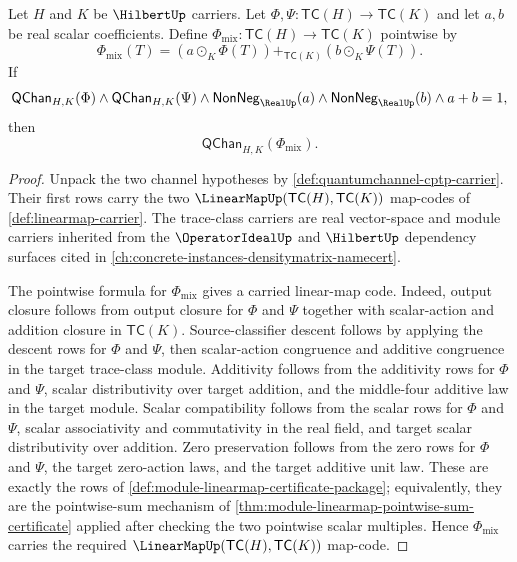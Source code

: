 \begin{lemma}
\label{lem:quantumchannel-binary-convex-mixture-closure}
Let $H$ and $K$ be $\HilbertUp$ carriers. Let $\Phi,\Psi:\mathsf{TC}(H)\to\mathsf{TC}(K)$ and let $a,b$ be real scalar coefficients. Define $\Phi_{\mathrm{mix}}:\mathsf{TC}(H)\to\mathsf{TC}(K)$ pointwise by
$$
\Phi_{\mathrm{mix}}(T)
=
(a\odot_K\Phi(T))+_{\mathsf{TC}(K)}(b\odot_K\Psi(T)).
$$
If
$$
\mathsf{QChan}_{H,K}(\Phi)
\land
\mathsf{QChan}_{H,K}(\Psi)
\land
\mathsf{NonNeg}_{\RealUp}(a)
\land
\mathsf{NonNeg}_{\RealUp}(b)
\land
 a+b=1,
$$
then
$$
\mathsf{QChan}_{H,K}(\Phi_{\mathrm{mix}}).
$$
\end{lemma}
\begin{proof}
Unpack the two channel hypotheses by \autoref{def:quantumchannel-cptp-carrier}. Their first rows carry the two $\LinearMapUp(\mathsf{TC}(H),\mathsf{TC}(K))$ map-codes of \autoref{def:linearmap-carrier}. The trace-class carriers are real vector-space and module carriers inherited from the $\OperatorIdealUp$ and $\HilbertUp$ dependency surfaces cited in \autoref{ch:concrete-instances-densitymatrix-namecert}.

The pointwise formula for $\Phi_{\mathrm{mix}}$ gives a carried linear-map code. Indeed, output closure follows from output closure for $\Phi$ and $\Psi$ together with scalar-action and addition closure in $\mathsf{TC}(K)$. Source-classifier descent follows by applying the descent rows for $\Phi$ and $\Psi$, then scalar-action congruence and additive congruence in the target trace-class module. Additivity follows from the additivity rows for $\Phi$ and $\Psi$, scalar distributivity over target addition, and the middle-four additive law in the target module. Scalar compatibility follows from the scalar rows for $\Phi$ and $\Psi$, scalar associativity and commutativity in the real field, and target scalar distributivity over addition. Zero preservation follows from the zero rows for $\Phi$ and $\Psi$, the target zero-action laws, and the target additive unit law. These are exactly the rows of \autoref{def:module-linearmap-certificate-package}; equivalently, they are the pointwise-sum mechanism of \autoref{thm:module-linearmap-pointwise-sum-certificate} applied after checking the two pointwise scalar multiples. Hence $\Phi_{\mathrm{mix}}$ carries the required $\LinearMapUp(\mathsf{TC}(H),\mathsf{TC}(K))$ map-code.


\end{proof}
